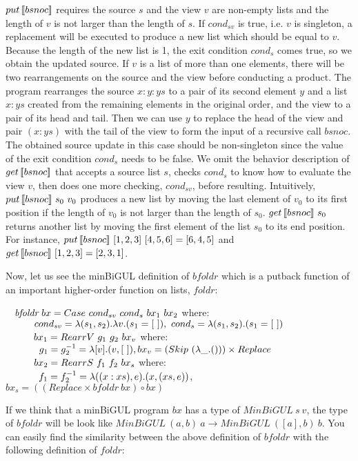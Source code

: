 $put \, [\![bsnoc]\!]$ requires the source $s$ and the view $v$ are non-empty lists and the length of $v$ is not larger than the length of $s$. If $cond_{sv}$ is true, i.e. $v$ is singleton, a replacement will be executed to produce a new list which should be equal to $v$. Because the length of the new list is 1, the exit condition $cond_s$ comes true, so we obtain the updated source. If $v$ is a list of more than one elements, there will be two rearrangements on the source and the view before conducting a product. The program rearranges the source $x:y:ys$ to a pair of its second element $y$ and a list $x:ys$ created from the remaining elements in the original order, and the view to a pair of its head and tail. Then we can use $y$ to replace the head of the view and pair $(x:ys)$ with the tail of the view to form the input of a recursive call $\textit{bsnoc}$. The obtained source update in this case should be non-singleton since the value of the exit condition $cond_s$ needs to be false. We omit the behavior description of $get \, [\![bsnoc]\!]$ that accepts a source list $s$, checks $cond_s$ to know how to evaluate the view $v$, then does one more checking, $cond_{sv}$, before resulting. 
%
Intuitively, $put \, [\![bsnoc]\!] \ s_0 \ v_0$ produces a new list by moving the last element of $v_0$ to its first position if the length of $v_0$ is not larger than the length of $s_0$. $get \, [\![bsnoc]\!] \ s_0$ returns another list by moving the first element of the list $s_0$ to its end position. For instance, $put \, [\![bsnoc]\!] \ [1,2,3] \ [4,5,6] = [6,4,5]$ and $get \, [\![bsnoc]\!] \ [1,2,3] = [2,3,1]$.

Now, let us see the minBiGUL definition of $\textit{bfoldr}$ which is a putback function of an important higher-order function on lists, $\textit{foldr}$:

$\tab \textit{bfoldr} \ bx = Case \ cond_{sv} \ cond_s \ bx_1 \ bx_2$ where:\\
$\tabs{3} \ cond_{sv} = \lambda (s_1,s_2).\lambda v.(s_1 = [\ ]), \ cond_s = \lambda (s_1,s_2).(s_1 = [\ ])$\\
$\tabs{3} \ bx_1 = RearrV \ g_1 \ g_2 \ bx_v$ where: \\
    $\tabs{4} g_1 = g_2^{-1} = \lambda [v].(v,[\ ]), bx_v = (Skip \ (\lambda \_.())) \times Replace$\\
$\tabs{3} \ bx_2 = RearrS \ f_1 \ f_2 \ bx_s$ where:\\
    $\tabs{4} f_1 = f_2^{-1} = \lambda ((x:xs),e).(x,(xs,e))$, 
$bx_s = ((Replace \times bfoldr \ bx) \circ bx)$

If we think that a minBiGUL program $bx$ has a type of $\textit{MinBiGUL} \ s \ v$, the type of $bfoldr$ will be look like $\textit{MinBiGUL} \ (a, b) \ a \to \textit{MinBiGUL} \ ([a], b) \ b$. You can easily find the similarity between the above definition of $\textit{bfoldr}$ with the following definition of $\textit{foldr}$:

